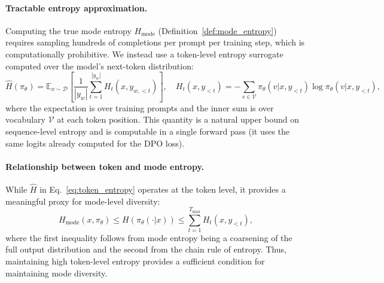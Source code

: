 \paragraph{Tractable entropy approximation.} Computing the true mode entropy $H_{\text{mode}}$ (Definition~\ref{def:mode_entropy}) requires sampling hundreds of completions per prompt per training step, which is computationally prohibitive. We instead use a token-level entropy surrogate computed over the model's next-token distribution:
\begin{equation}
\label{eq:token_entropy}
\hat{H}(\pi_\theta) = \mathbb{E}_{x \sim \mathcal{D}} \left[\frac{1}{|y_w|} \sum_{t=1}^{|y_w|} H_t(x, y_{w,<t})\right], \quad H_t(x, y_{<t}) = -\sum_{v \in \mathcal{V}} \pi_\theta(v|x, y_{<t}) \log \pi_\theta(v|x, y_{<t}),
\end{equation}
where the expectation is over training prompts and the inner sum is over vocabulary $\mathcal{V}$ at each token position. This quantity is a natural upper bound on sequence-level entropy and is computable in a single forward pass (it uses the same logits already computed for the DPO loss).

\paragraph{Relationship between token and mode entropy.} While $\hat{H}$ in Eq.~\eqref{eq:token_entropy} operates at the token level, it provides a meaningful proxy for mode-level diversity:
\begin{equation}
H_{\text{mode}}(x, \pi_\theta) \leq H(\pi_\theta(\cdot|x)) \leq \sum_{t=1}^{T_{\max}} H_t(x, y_{<t}),
\end{equation}
where the first inequality follows from mode entropy being a coarsening of the full output distribution and the second from the chain rule of entropy. Thus, maintaining high token-level entropy provides a sufficient condition for maintaining mode diversity.

